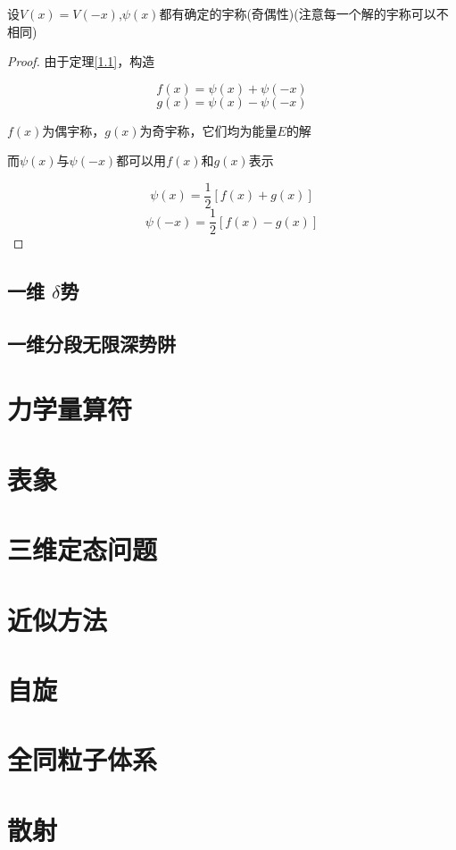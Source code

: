         \begin{thm}
            设$V(x)=V(-x)$,$\psi(x)$都有确定的宇称(奇偶性)(注意每一个解的宇称可以不相同)
            
            \begin{proof}
                
                由于定理\ref*{1.1}，构造 
                   
                    $$ f(x) = \psi(x)+\psi(-x) $$                          %
                    $$ g(x) = \psi(x)-\psi(-x) $$
                
                $f(x)$为偶宇称，$g(x)$为奇宇称，它们均为能量$E$的解       \par  %
                而$\psi(x)$与$\psi(-x)$都可以用$f(x)$和$g(x)$表示    

                $$ \psi(x) = \frac{1}{2} [f(x)+g(x)]  $$
                $$ \psi(-x) = \frac{1}{2} [f(x)-g(x)] $$    

           \end{proof}

        \end{thm}
        
       
        
        \subsection{一维 \texorpdfstring{$\delta$}{}势}   %
        \subsection{一维分段无限深势阱}



    \section{力学量算符}


    \section{表象}


    \section{三维定态问题}

    \section{近似方法}

    \section{自旋}

    \section{全同粒子体系}

    \section{散射}
    
    



  
